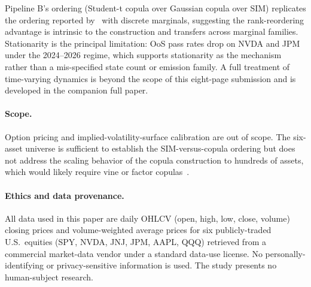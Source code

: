 \documentclass[sigconf,anonymous,nonacm=true]{acmart}
\begin{document}
Pipeline B's ordering (Student-t copula over Gaussian copula over SIM)
replicates the ordering reported by~\cite{alswaidan2026hybrid} with
discrete marginals, suggesting the rank-reordering advantage is
intrinsic to the construction and transfers across marginal families.
Stationarity is the principal limitation: OoS pass rates drop on NVDA
and JPM under the 2024--2026 regime, which supports stationarity as
the mechanism rather than a mis-specified state count or emission family.
A full treatment of time-varying dynamics is beyond the scope of this
eight-page submission and is developed in the companion full paper.

\paragraph{Scope.} Option pricing and implied-volatility-surface
calibration are out of scope. The six-asset universe is sufficient to
establish the SIM-versus-copula ordering but does not address the
scaling behavior of the copula construction to hundreds of assets,
which would likely require vine or factor copulas~\cite{bedford2002vines}.

\paragraph{Ethics and data provenance.} All data used in this paper
are daily OHLCV (open, high, low, close, volume) closing prices and
volume-weighted average prices for six publicly-traded U.S.\ equities
(SPY, NVDA, JNJ, JPM, AAPL, QQQ) retrieved from a commercial market-data
vendor under a standard data-use license. No personally-identifying or
privacy-sensitive information is used. The study presents no human-subject
research.



\end{document}
